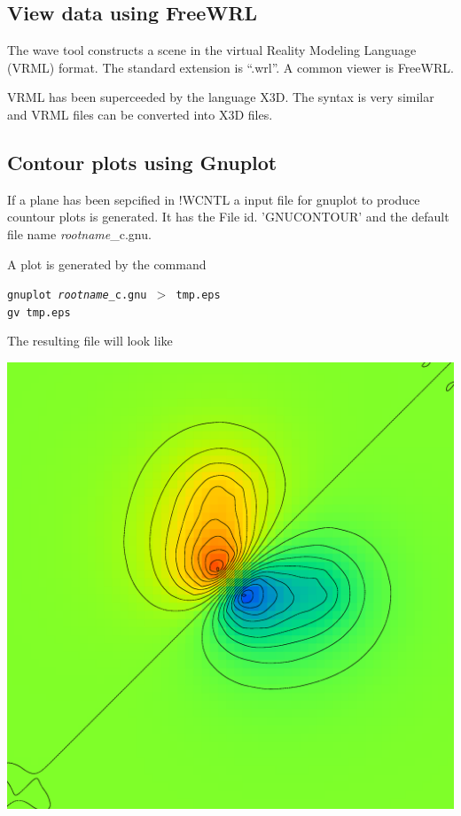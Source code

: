 \documentclass[final,12pt]{article}
\begin{document}
{{{{{{\subsection{View data using FreeWRL}
The wave tool constructs a scene in the virtual Reality Modeling
Language (VRML) format. The standard extension is ``.wrl''. A common
viewer is FreeWRL.

VRML has been superceeded by the language X3D. The syntax is very
similar and VRML files can be converted into X3D files.

\newpage
\subsection{Contour plots using Gnuplot}
If a plane has been sepcified in !WCNTL a input file for gnuplot to
produce countour plots is generated. It has the File id. 'GNUCONTOUR'
and the default file name \textit{rootname}\_c.gnu.

A plot is generated by the command
\begin{center}
\begin{minipage}{0.7\linewidth}
{\tt gnuplot {\it rootname}\_c.gnu $>$ tmp.eps}\\
{\tt gv tmp.eps}
\end{minipage}
\end{center}

The resulting file will look like
\begin{center}
\includegraphics[width=0.5\linewidth,clip=true]{Figs/gnucontour.eps}
\end{center}


}}}}}}
\end{document}

